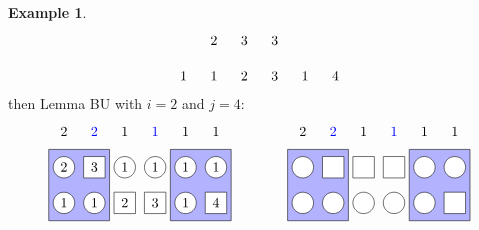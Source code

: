 \documentclass[reqno]{amsart}
\newcommand{\0}{\phantom{c}}
\theoremstyle{plain}
\theoremstyle{definition}
\newtheorem{example}[thm]{Example}
\numberwithin{equation}{section}
\begin{document}
\begin{example}
\[\begin{tikzpicture}[scale=0.9]
  \foreach \i in {2} { \node at (\i*\sc,\ll) {$2$}; }
  \foreach \i in {3,4} { \node at (\i*\sc,\ll) {$3$}; }
  \foreach \i in {1,2,5} { \node at (\i*\sc,\l) {$1$}; }
  \foreach \i in {3} { \node at (\i*\sc,\l) {$2$}; }
  \foreach \i in {4} { \node at (\i*\sc,\l) {$3$}; }
  \foreach \i in {6} { \node at (\i*\sc,\l) {$4$}; }
\end{tikzpicture}
\]
then Lemma BU with $i=2$ and $j=4$:
\[
\begin{tikzpicture}[scale=0.9]
  \def\sc{0.85}   %
  \def\lll{3}  %
  \def\ll{2}   %
  \def\l{1}   %
  \draw[fill=blue!30] (0.5*\sc,\l-.5) rectangle(2.5*\sc,\ll+.5);
  \draw[fill=blue!30] (4.5*\sc,\l-.5) rectangle(6.5*\sc,\ll+.5);
  \foreach \i in {1,3,4,5,6} { \draw[fill=white] (\i*\sc,\ll) circle (0.3); }
  \foreach \i in {2} { \draw[fill=white] (\i*\sc-.3,\ll-.3) rectangle +(0.6,+0.6); }
  \foreach \i in {1,2,5} { \draw[fill=white] (\i*\sc,\l) circle (0.3); }
  \foreach \i in {3,4,6} { \draw[fill=white] (\i*\sc-.3,\l-.3) rectangle +(0.6,+0.6); }
  \node[blue] at (2*\sc,\lll) {$2$};
  \node[blue] at (4*\sc,\lll) {$1$};
  \foreach \i in {3,5,6} { \node at (\i*\sc,\lll) {$1$}; }
  \foreach \i in {1} { \node at (\i*\sc,\lll) {$2$}; }
  \foreach \i in {3,4,5,6} { \node at (\i*\sc,\ll) {$1$}; }
  \foreach \i in {1} { \node at (\i*\sc,\ll) {$2$}; }
  \foreach \i in {2} { \node at (\i*\sc,\ll) {$3$}; }
  \foreach \i in {1,2,5} { \node at (\i*\sc,\l) {$1$}; }
  \foreach \i in {3} { \node at (\i*\sc,\l) {$2$}; }
  \foreach \i in {4} { \node at (\i*\sc,\l) {$3$}; }
  \foreach \i in {6} { \node at (\i*\sc,\l) {$4$}; }
\end{tikzpicture}
\hspace{40pt}
\begin{tikzpicture}[scale=0.9]
  \def\sc{0.85}   %
  \def\lll{3}  %
  \def\ll{2}   %
  \def\l{1}   %
  \draw[fill=blue!30] (0.5*\sc,\l-.5) rectangle(2.5*\sc,\ll+.5);
  \draw[fill=blue!30] (4.5*\sc,\l-.5) rectangle(6.5*\sc,\ll+.5);
  \foreach \i in {1,5,6} { \draw[fill=white] (\i*\sc,\ll) circle (0.3); }
  \foreach \i in {2,3,4} { \draw[fill=white] (\i*\sc-.3,\ll-.3) rectangle +(0.6,+0.6); }
  \foreach \i in {1,2,3,4,5} { \draw[fill=white] (\i*\sc,\l) circle (0.3); }
  \foreach \i in {6} { \draw[fill=white] (\i*\sc-.3,\l-.3) rectangle +(0.6,+0.6); }
  \node[blue] at (2*\sc,\lll) {$2$};
  \node[blue] at (4*\sc,\lll) {$1$};
  \foreach \i in {3,5,6} { \node at (\i*\sc,\lll) {$1$}; }
  \foreach \i in {1} { \node at (\i*\sc,\lll) {$2$}; }

\end{tikzpicture}\]
\end{example}
\end{document}
